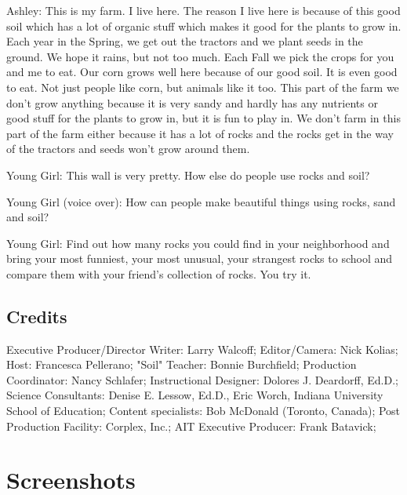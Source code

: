 Ashley: This is my farm. I live here. The reason I live here is because of this good soil which has a lot of organic stuff which makes it good for the plants to grow in. Each year in the Spring, we get out the tractors and we plant seeds in the ground. We hope it rains, but not too much. Each Fall we pick the crops for you and me to eat. Our corn grows well here because of our good soil. It is even good to eat. Not just people like corn, but animals like it too. This part of the farm we don't grow anything because it is very sandy and hardly has any nutrients or good stuff for the plants to grow in, but it is fun to play in. We don't farm in this part of the farm either because it has a lot of rocks and the rocks get in the way of the tractors and seeds won't grow around them.

Young Girl: This wall is very pretty. How else do people use rocks and soil?

Young Girl (voice over): How can people make beautiful things using rocks, sand and soil?

Young Girl: Find out how many rocks you could find in your neighborhood and bring your most funniest, your most unusual, your strangest rocks to school and compare them with your friend's collection of rocks. You try it.

\subsection{Credits}

Executive Producer/Director Writer: Larry Walcoff;
Editor/Camera: Nick Kolias;
Host: Francesca Pellerano;
"Soil" Teacher: Bonnie Burchfield;
Production Coordinator: Nancy Schlafer;
Instructional Designer: Dolores J. Deardorff, Ed.D.;
Science Consultants: Denise E. Lessow, Ed.D., Eric Worch, Indiana University School of Education;
Content specialists: Bob McDonald (Toronto, Canada);
Post Production Facility: Corplex, Inc.;
AIT Executive Producer: Frank Batavick;

\clearpage
\newpage

\section{Screenshots}

